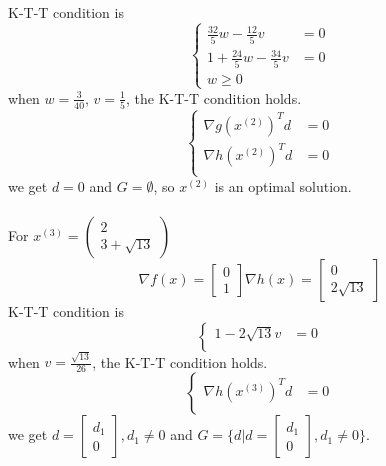 \documentclass[paper=a4, fontsize=11pt]{scrartcl} %
\numberwithin{equation}{section} %
\numberwithin{figure}{section} %
\numberwithin{table}{section} %
\begin{document}
K-T-T condition is
\begin{equation} \nonumber
\left\{
\begin{aligned}
\frac{32}{5}w-\frac{12}{5}v &= 0\\
1+\frac{24}{5}w-\frac{34}{5}v &= 0\\
w \geq 0
\end{aligned}
\right.
\end{equation}
when $w=\frac{3}{40}$, $v=\frac{1}{5}$, the K-T-T condition holds.\\
\begin{equation} \nonumber
\left\{
\begin{aligned}
\nabla g(x^{(2)})^Td &= 0\\
\nabla h(x^{(2)})^Td &= 0\\
\end{aligned}
\right.
\end{equation}
we get $d=0$ and $G=\emptyset$, so $x^{(2)}$ is an optimal solution.\\
\\
For $x^{(3)}=\begin{pmatrix} 2 \\ 3+\sqrt{13}\end{pmatrix}$
\begin{equation} \nonumber
\nabla f(x) = \begin{bmatrix}0\\1\end{bmatrix}
\nabla h(x) = \begin{bmatrix}0\\2\sqrt{13}\end{bmatrix}
\end{equation}
K-T-T condition is
\begin{equation} \nonumber
\left\{
\begin{aligned}
1-2\sqrt{13}v &= 0\\
\end{aligned}
\right.
\end{equation}
when $v=\frac{\sqrt{13}}{26}$, the K-T-T condition holds.\\
\begin{equation} \nonumber
\left\{
\begin{aligned}
\nabla h(x^{(3)})^Td &= 0\\
\end{aligned}
\right.
\end{equation}
we get $d=\begin{bmatrix}d_1\\0\end{bmatrix},d_1\neq0$ and $G=\{d|d=\begin{bmatrix}d_1\\0\end{bmatrix},d_1\neq0\}$.
\end{document}
